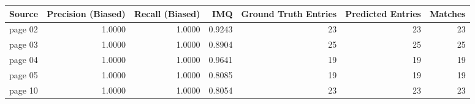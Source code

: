 \begin{tabular}{lrrrrrr}
\toprule
Source & Precision (Biased) & Recall (Biased) & IMQ & Ground Truth Entries & Predicted Entries & Matches \\
\midrule
page 02 & 1.0000 & 1.0000 & 0.9243 & 23 & 23 & 23 \\
page 03 & 1.0000 & 1.0000 & 0.8904 & 25 & 25 & 25 \\
page 04 & 1.0000 & 1.0000 & 0.9641 & 19 & 19 & 19 \\
page 05 & 1.0000 & 1.0000 & 0.8085 & 19 & 19 & 19 \\
page 10 & 1.0000 & 1.0000 & 0.8054 & 23 & 23 & 23 \\
\bottomrule
\end{tabular}
